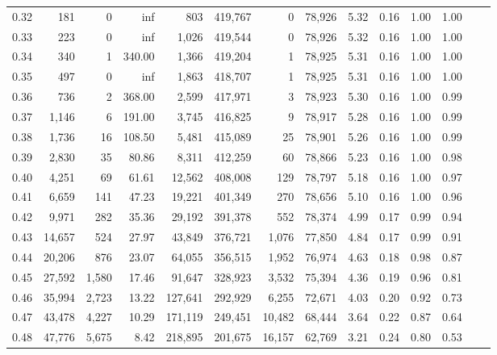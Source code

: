 \begin{tabular}{rrrrrrrrrrrrrr}
0.32 &     181 &      0 &     inf &      803 &  419,767 &       0 &  78,926 &  5.32 &  0.16 &  1.00 &      1.00 \\
0.33 &     223 &      0 &     inf &    1,026 &  419,544 &       0 &  78,926 &  5.32 &  0.16 &  1.00 &      1.00 \\
0.34 &     340 &      1 &  340.00 &    1,366 &  419,204 &       1 &  78,925 &  5.31 &  0.16 &  1.00 &      1.00 \\
0.35 &     497 &      0 &     inf &    1,863 &  418,707 &       1 &  78,925 &  5.31 &  0.16 &  1.00 &      1.00 \\
0.36 &     736 &      2 &  368.00 &    2,599 &  417,971 &       3 &  78,923 &  5.30 &  0.16 &  1.00 &      0.99 \\
0.37 &   1,146 &      6 &  191.00 &    3,745 &  416,825 &       9 &  78,917 &  5.28 &  0.16 &  1.00 &      0.99 \\
0.38 &   1,736 &     16 &  108.50 &    5,481 &  415,089 &      25 &  78,901 &  5.26 &  0.16 &  1.00 &      0.99 \\
0.39 &   2,830 &     35 &   80.86 &    8,311 &  412,259 &      60 &  78,866 &  5.23 &  0.16 &  1.00 &      0.98 \\
0.40 &   4,251 &     69 &   61.61 &   12,562 &  408,008 &     129 &  78,797 &  5.18 &  0.16 &  1.00 &      0.97 \\
0.41 &   6,659 &    141 &   47.23 &   19,221 &  401,349 &     270 &  78,656 &  5.10 &  0.16 &  1.00 &      0.96 \\
0.42 &   9,971 &    282 &   35.36 &   29,192 &  391,378 &     552 &  78,374 &  4.99 &  0.17 &  0.99 &      0.94 \\
0.43 &  14,657 &    524 &   27.97 &   43,849 &  376,721 &   1,076 &  77,850 &  4.84 &  0.17 &  0.99 &      0.91 \\
0.44 &  20,206 &    876 &   23.07 &   64,055 &  356,515 &   1,952 &  76,974 &  4.63 &  0.18 &  0.98 &      0.87 \\
0.45 &  27,592 &  1,580 &   17.46 &   91,647 &  328,923 &   3,532 &  75,394 &  4.36 &  0.19 &  0.96 &      0.81 \\
0.46 &  35,994 &  2,723 &   13.22 &  127,641 &  292,929 &   6,255 &  72,671 &  4.03 &  0.20 &  0.92 &      0.73 \\
0.47 &  43,478 &  4,227 &   10.29 &  171,119 &  249,451 &  10,482 &  68,444 &  3.64 &  0.22 &  0.87 &      0.64 \\
0.48 &  47,776 &  5,675 &    8.42 &  218,895 &  201,675 &  16,157 &  62,769 &  3.21 &  0.24 &  0.80 &      0.53 \\

\end{tabular}
